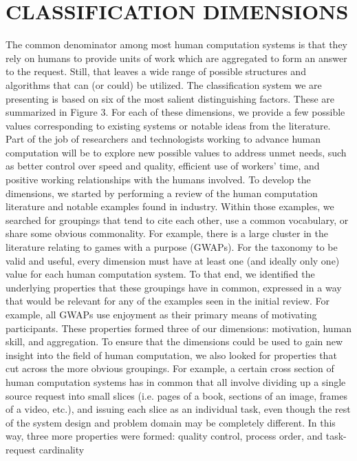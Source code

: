 \documentclass{acm_proc_article-sp} %
\begin{document}
\section{CLASSIFICATION DIMENSIONS}
 The common denominator among most human computation systems is that they rely on humans to provide units of work which are aggregated to form an answer to the request. Still, that leaves a wide range of possible structures and algorithms that can (or could) be utilized. The classification system we are presenting is based on six of the most salient distinguishing factors.  These are summarized in Figure 3.  For each of these dimensions, we provide a few possible values corresponding to existing systems or notable ideas from the literature. Part of the job of researchers and technologists working to advance human computation will be to explore new possible values to address unmet needs, such as better control over speed and quality,  efficient use of workers’ time, and positive working relationships with the humans involved. To develop the dimensions, we started by performing a review of the human computation literature and notable examples found in industry.  Within those examples, we searched for groupings that tend to cite each other, use a common vocabulary, or share some obvious commonality.  For example, there is a large cluster in the literature relating to games with a purpose (GWAPs). For the taxonomy to be valid and useful, every dimension must have at least one (and ideally only one) value for each human computation system.  To that end, we identified the underlying properties that these groupings have in common, expressed in a way that would be relevant for any of the examples seen in the initial review.  For example, all GWAPs use enjoyment as their primary means of motivating participants.  These properties formed three of our dimensions:  motivation, human skill, and aggregation. To ensure that the dimensions could be used to gain new insight into the field of human computation, we also looked for properties that cut across the more obvious groupings.  For example, a certain cross section of human computation systems has in common that all involve dividing up a single source request into small slices (i.e. pages of a book, sections of an image, frames of a video, etc.), and issuing each slice as an individual task, even though the rest of the system design and problem domain may be completely different.  In this way, three more properties were formed: quality control, process order, and task-request cardinality
\end{document}
